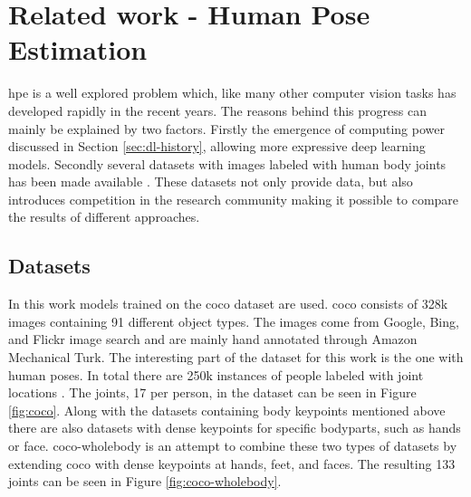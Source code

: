 \chapter{Related work - Human Pose Estimation} \label{sec:pose_estimation} \label{ch:hpe}
\gls{hpe} is a well explored problem which, like many other computer vision tasks has developed rapidly in the recent years. The reasons behind this progress can mainly be explained by two factors. Firstly the emergence of computing power discussed in Section \ref{sec:dl-history}, allowing more expressive deep learning models. Secondly several datasets with images labeled with human body joints has been made available \cite{Chen2020}. These datasets not only provide data, but also introduces competition in the research community making it possible to compare the results of different approaches.

\section{Datasets} \label{sec:datasets}

In this work models trained on the \gls{coco} dataset are used. \gls{coco} consists of 328k images containing 91 different object types. The images come from Google, Bing, and Flickr image search and are mainly hand annotated through Amazon Mechanical Turk. The interesting part of the dataset for this work is the one with human poses. In total there are 250k instances of people labeled with joint locations \cite{Lin2014}. The joints, 17 per person, in the dataset can be seen in Figure \ref{fig:coco}. Along with the datasets containing body keypoints mentioned above there are also datasets with dense keypoints for specific bodyparts, such as hands or face. \gls{coco}-wholebody \cite{Jin2020} is an attempt to combine these two types of datasets by extending \gls{coco} with dense keypoints at hands, feet, and faces. The resulting 133 joints can be seen in Figure \ref{fig:coco-wholebody}.

